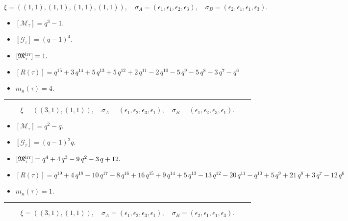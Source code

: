 \documentclass[10pt,a4paper]{amsart}
\begin{document}
$$\xi = ({(1, 1), (1, 1), (1, 1)}, {(1, 1)}),\quad \sigma_A = ({{\epsilon_1}, {\epsilon_1}, {\epsilon_2}}, {{\epsilon_3}}),\quad \sigma_B = ({{\epsilon_2}, {\epsilon_1}, {\epsilon_1}}, {{\epsilon_3}}).$$

\begin{itemize}
 \item $[\mathcal{M}_{\tau}] = q^{3} - 1 .$

 \item $[\mathcal{G}_{\tau}] = {\left(q - 1\right)}^{4} .$

 \item $[{\frak M}_{\tau}^{\textrm{irr}}] = 1 .$

 \item $[R(\tau)] = q^{15} + 3 \, q^{14} + 5 \, q^{13} + 5 \, q^{12} + 2 \, q^{11} - 2 \, q^{10} - 5 \, q^{9} - 5 \, q^{8} - 3 \, q^{7} - q^{6} $

 \item $m_{\kappa}(\tau) = 4 .$

 \end{itemize}
\noindent\rule{8cm}{0.4pt}

$$\xi = ({(3, 1)}, {(1, 1)}),\quad \sigma_A = ({{\epsilon_1, \epsilon_2, \epsilon_3}}, {{\epsilon_1}}),\quad \sigma_B = ({{\epsilon_1, \epsilon_2, \epsilon_3}}, {{\epsilon_1}}).$$

\begin{itemize}
 \item $[\mathcal{M}_{\tau}] = q^{2} - q .$

 \item $[\mathcal{G}_{\tau}] = {\left(q - 1\right)}^{2} q .$

 \item $[{\frak M}_{\tau}^{\textrm{irr}}] = q^{4} + 4 \, q^{3} - 9 \, q^{2} - 3 \, q + 12 .$

 \item $[R(\tau)] = q^{19} + 4 \, q^{18} - 10 \, q^{17} - 8 \, q^{16} + 16 \, q^{15} + 9 \, q^{14} + 5 \, q^{13} - 13 \, q^{12} - 20 \, q^{11} - q^{10} + 5 \, q^{9} + 21 \, q^{8} + 3 \, q^{7} - 12 \, q^{6} $

 \item $m_{\kappa}(\tau) = 1 .$

 \end{itemize}
\noindent\rule{8cm}{0.4pt}

$$\xi = ({(3, 1)}, {(1, 1)}),\quad \sigma_A = ({{\epsilon_1, \epsilon_2, \epsilon_3}}, {{\epsilon_1}}),\quad \sigma_B = ({{\epsilon_2, \epsilon_1, \epsilon_1}}, {{\epsilon_3}}).$$
\end{document}
